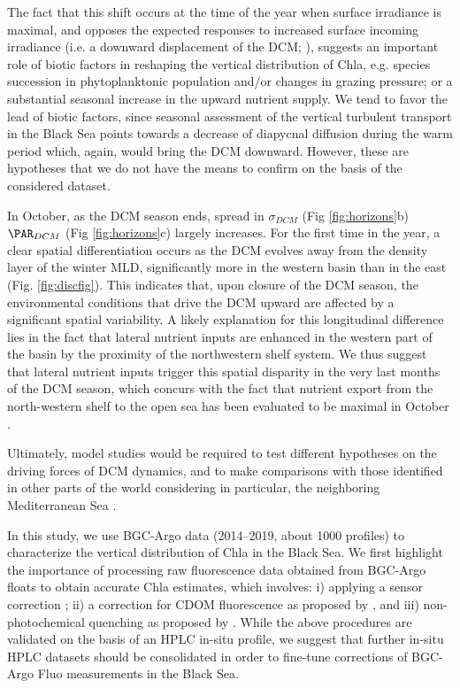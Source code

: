 \documentclass[journal abbreviation, manuscript]{copernicus}
\begin{document}
The fact that this shift occurs at the time of the year when surface irradiance is maximal, and opposes the expected responses to increased surface incoming irradiance (i.e. a downward displacement of the DCM; \citet{Beckmann2007}), suggests an important role of biotic factors in reshaping the vertical distribution of Chla, e.g. species succession in phytoplanktonic population \citep{Mikaelyan2018} and/or changes in grazing pressure; or a substantial seasonal increase in the upward nutrient supply.
We tend to favor the lead of biotic factors, since seasonal assessment of the vertical turbulent transport in the Black Sea points towards a decrease of diapycnal diffusion during the warm period \citep{Podymov2020-ls} which, again, would bring the DCM downward. 
However, these are hypotheses that we do not have the means to confirm on the basis of the considered dataset.

In October, as the DCM season ends, spread in $\sigma_{DCM}$ (Fig \ref{fig:horizons}b) $\PAR_{DCM}$ (Fig \ref{fig:horizons}c) largely increases.
For the first time in the year, a clear spatial differentiation occurs as the DCM evolves away from the density layer of the  winter MLD, significantly more in the western basin than in the east (Fig. \ref{fig:discfig}).
This indicates that, upon closure of the DCM season, the environmental conditions that drive the DCM upward are affected by a significant spatial variability. 
A likely explanation for this longitudinal difference lies in the fact that lateral nutrient inputs are enhanced in the western part of the basin by the proximity of the northwestern shelf system.
We thus suggest that lateral nutrient inputs trigger this spatial disparity in the very last months of the DCM season, which concurs with the fact that nutrient export from the north-western shelf to the open sea has been evaluated to be maximal in October \citep{gregoire2004}.

Ultimately, model studies would be required to test different hypotheses on the driving forces of DCM dynamics, and to make comparisons with those identified in other parts of the world considering in particular, the neighboring Mediterranean Sea \citep{Terzic2019}.

\conclusions 
In this study, we use BGC-Argo data (2014--2019, about 1000 profiles) to characterize the vertical distribution of Chla in the Black Sea. 
We first highlight the importance of processing raw fluorescence data obtained from BGC-Argo floats to obtain accurate Chla estimates, which involves: i) applying a sensor correction \citep{Roesler2017}; ii) a correction for CDOM fluorescence as proposed by \citet{Xing2017}, and iii) non-photochemical quenching as proposed by \citet{Xing2012}.
While the above procedures are validated on the basis of an HPLC in-situ profile, we suggest that further in-situ HPLC datasets should be consolidated in order to fine-tune corrections of BGC-Argo Fluo measurements in the Black Sea.
\end{document}
